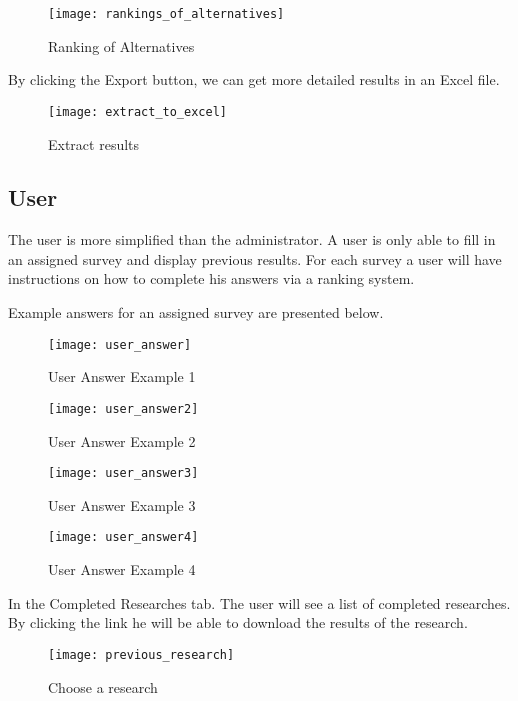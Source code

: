 \documentclass{article}
\begin{document}
\begin{figure}[h!]
\centering
\texttt{[image: rankings\_of\_alternatives]}
\caption{Ranking of Alternatives}
\label{fig:ranking of alternatives}
\end{figure}


By clicking the Export button, we can get more detailed results in an Excel file.

\begin{figure}[h!]
\centering
\texttt{[image: extract\_to\_excel]}
\caption{Extract results}
\label{fig:extract-to-excel}
\end{figure}

\subsection*{User}

The user is more simplified than the administrator. A user is only able to fill in an assigned survey and display previous results. For each survey a user will have instructions on how to complete his answers via a ranking system.

Example answers for an assigned survey are presented below.

\begin{figure}[h!]
\centering
\texttt{[image: user\_answer]}
\caption{User Answer Example 1}
\label{fig:user_answer1}
\end{figure}

\begin{figure}[h!]
\centering
\texttt{[image: user\_answer2]}
\caption{User Answer Example 2}
\label{fig:user_answer2}
\end{figure}

\begin{figure}[h!]
\centering
\texttt{[image: user\_answer3]}
\caption{User Answer Example 3}
\label{fig:user_answer3}
\end{figure}


\begin{figure}[h!]
\centering
\texttt{[image: user\_answer4]}
\caption{User Answer Example 4}
\label{fig:user_answer4}
\end{figure}


In the Completed Researches tab. The user will see a list of completed researches. By clicking the link he will be able to download the results of the research.

\begin{figure}
\centering
\texttt{[image: previous\_research]}
\caption{Choose a research}
\label{fig:previous_research}
\end{figure}









































\end{document}
